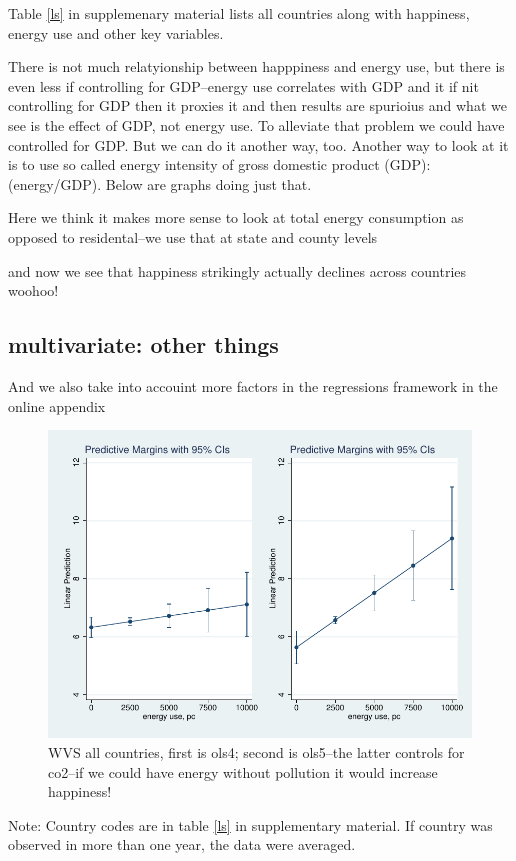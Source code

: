 \documentclass[10pt, letterpaper]{article}
\begin{document}
\begin{spacing}{1.4}
Table \ref{ls} in supplemenary material lists all countries along with
happiness, energy use and other key variables.


There is not much relatyionship between happpiness and energy use, but there is
even less if controlling for GDP--energy use correlates with GDP and it if nit
controlling for GDP then it proxies it and then results are spurioius and what
we see is the effect of GDP, not energy use.  
To alleviate that problem we could have controlled for GDP. But we can do it
another way, too. 
Another way to look at it is to use so called energy intensity of gross domestic
product (GDP): (energy/GDP). Below  are graphs doing just that.

Here we think it makes more sense to look at total energy consumption as opposed
to residental--we use  that at state and county levels 


and now we see that happiness strikingly actually declines across countries woohoo!

\subsection{multivariate: other things}

And we also take into accouint more factors in the regressions framework in the
online appendix

\begin{figure}[H]
 \includegraphics[width=6in]{graphsAndTables/ols4ols5.pdf}\centering
\caption{WVS all countries, first is ols4; second is ols5--the latter controls
  for co2--if we could have energy without pollution it would increase happiness! }\label{ols4ols5}
\end{figure}
{\scriptsize Note: Country codes are in table \ref{ls} in supplementary
  material. If country was observed in more than one year, the data were averaged.}



\end{spacing}
\end{document}

